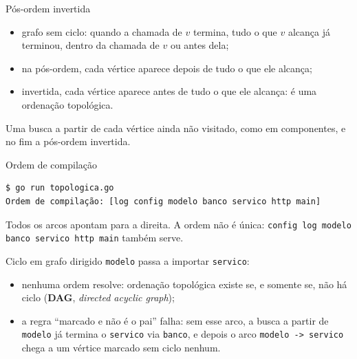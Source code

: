 \documentclass{beamer}
\begin{document}
\begin{frame}{Pós-ordem invertida}
	\begin{itemize}
		\item grafo sem ciclo: quando a chamada de $v$ termina, tudo o que $v$
		      alcança já terminou, dentro da chamada de $v$ ou antes dela;
		\item na pós-ordem, cada vértice aparece depois de tudo o que ele
		      alcança;
		\item invertida, cada vértice aparece antes de tudo o que ele alcança: é
		      uma ordenação topológica.
	\end{itemize}

	\vspace{0.2cm}
	Uma busca a partir de cada vértice ainda não visitado, como em componentes,
	e no fim a pós-ordem invertida.
\end{frame}

\begin{frame}[fragile]{Ordem de compilação}
	\begin{verbatim}
$ go run topologica.go
Ordem de compilação: [log config modelo banco servico http main]
\end{verbatim}

	\begin{center}
		\scalebox{0.82}{\grafoPacotesOrdem}
	\end{center}

	Todos os arcos apontam para a direita. A ordem não é única:
	\texttt{config log modelo banco servico http main} também serve.
\end{frame}

\begin{frame}{Ciclo em grafo dirigido}
	\texttt{modelo} passa a importar \texttt{servico}:

	\begin{center}
		\scalebox{0.85}{\grafoPacotesCiclo}
	\end{center}

	\begin{itemize}
		\item nenhuma ordem resolve: ordenação topológica existe se, e somente
		      se, não há ciclo (\textbf{DAG}, \textit{directed acyclic graph});
		\item a regra ``marcado e não é o pai'' falha: sem esse arco, a busca
		      a partir de \texttt{modelo} já termina o \texttt{servico} via
		      \texttt{banco}, e depois o arco \texttt{modelo -> servico} chega a
		      um vértice marcado sem ciclo nenhum.
	\end{itemize}
\end{frame}
\end{document}
